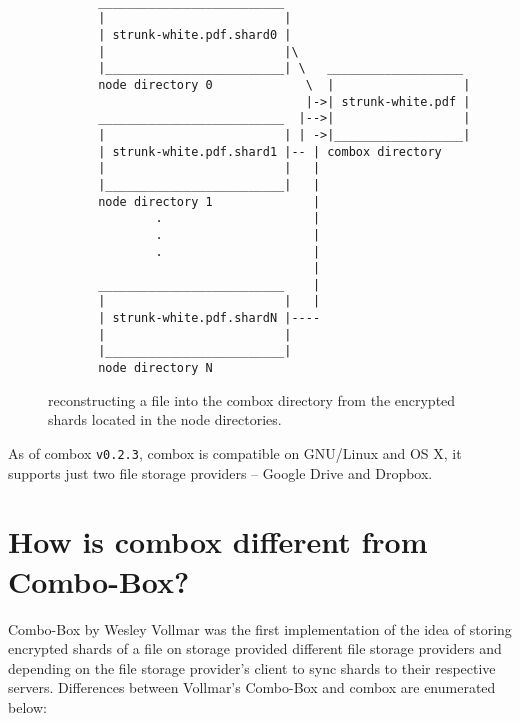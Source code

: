 \begin{figure}[h]
\begin{verbatim}

       __________________________
       |                         |
       | strunk-white.pdf.shard0 |
       |                         |\
       |_________________________| \   ___________________
       node directory 0             \  |                  |
                                    |->| strunk-white.pdf |
       __________________________  |-->|                  |
       |                         | | ->|__________________|
       | strunk-white.pdf.shard1 |-- | combox directory
       |                         |   |
       |_________________________|   |
       node directory 1              |
               .                     |
               .                     |
               .                     |
                                     |
       __________________________    |
       |                         |   |
       | strunk-white.pdf.shardN |----
       |                         |
       |_________________________|
       node directory N

\end{verbatim}
  \caption{reconstructing a file into the combox directory from the
    encrypted shards located in the node directories.}
\label{fig:1-combox-overview-1}
\end{figure}

As of combox \verb+v0.2.3+, combox is compatible on GNU/Linux and OS
X, it supports just two file storage providers -- Google Drive and
Dropbox.

\section{How is combox different from Combo-Box?}\label{1-sec-cb-diff}

Combo-Box by Wesley Vollmar\cite{vollmar-combo-box} was the first
implementation of the idea of storing encrypted shards of a file on
storage provided different file storage providers and depending on the
file storage provider's client to sync shards to their respective
servers. Differences between Vollmar's Combo-Box and combox are
enumerated below:

